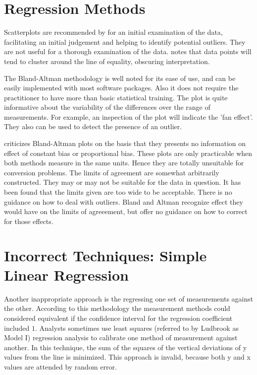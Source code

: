 \documentclass[12pt, a4paper]{report}
\theoremstyle{plain}
\theoremstyle{definition}
\theoremstyle{remark}
\begin{document}
\section{Regression Methods}

Scatterplots are recommended by \citet{BA83} for an initial
examination of the data, facilitating an initial judgement and
helping to identify potential outliers. They are not useful for a
thorough examination of the data. \citet{BritHypSoc} notes that
data points will tend to cluster around the line of equality,
obscuring interpretation.


The Bland-Altman methodology is well noted for its ease of use,
and can be easily implemented with most software packages. Also it
does not require the practitioner to have more than basic
statistical training. The plot is quite informative about the
variability of the differences over the range of measurements. For
example, an inspection of the plot will indicate the 'fan effect'.
They also can be used to detect the presence of an outlier.

\citet{ludbrook97,ludbrook02} criticizes Bland-Altman plots on the
basis that they presents no information on effect of constant bias
or proportional bias. These plots are only practicable when both
methods measure in the same units. Hence they are totally
unsuitable for conversion problems. The limits of agreement are
somewhat arbitrarily constructed. They may or may not be suitable
for the data in question. It has been found that the limits given
are too wide to be acceptable. There is no guidance on how to deal
with outliers. Bland and Altman recognize effect they would have
on the limits of agreeement, but offer no guidance on how to
correct for those effects.	

	\section{Incorrect Techniques: Simple Linear Regression}
	
	

	Another inappropriate approach is the regressing one set of measurements against the other. According to this methodology the measurement methods could considered equivalent if the confidence interval for
	the regression coefficient included $1$. Analysts sometimes use least squares (referred to by Ludbrook as Model I) regression analysis to calibrate one method of measurement against another. In this technique, the sum of the squares of the vertical deviations of y values from the line is minimized. This approach is invalid, because both y and x values are attended by random error.
	
\end{document}
